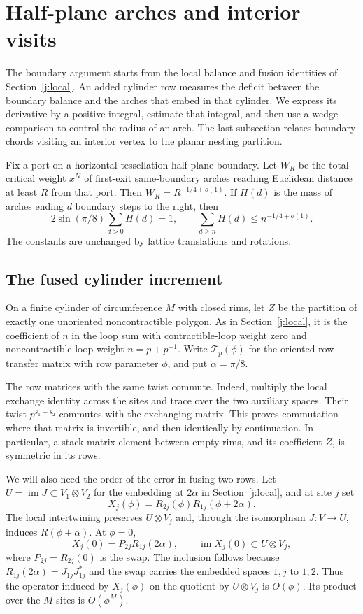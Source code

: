 \section{Half-plane arches and interior visits}\label{c7:boundary}

The boundary argument starts from the local balance and fusion identities of
Section~\ref{j:local}. An added cylinder row measures the deficit between
the boundary balance and the arches that embed in that cylinder. We express
its derivative by a positive integral, estimate that integral, and then use
a wedge comparison to control the radius of an arch. The last subsection
relates boundary chords visiting an interior vertex to the planar nesting
partition.

\begin{proposition}\label{j:boundary}
Fix a port on a horizontal tessellation half-plane boundary. Let $W_R$
be the total critical weight $x^N$ of first-exit same-boundary arches
reaching Euclidean distance at least $R$ from that port. Then
$W_R=R^{-1/4+o(1)}$. If $H(d)$ is the mass of arches ending $d$ boundary
steps to the right, then
\[
 2\sin(\pi/8)\sum_{d>0}H(d)=1,\qquad
 \sum_{d\ge n}H(d)\le n^{-1/4+o(1)}.
\]
The constants are unchanged by lattice translations and rotations.
\end{proposition}

\subsection{The fused cylinder increment}

On a finite cylinder of circumference $M$ with closed rims, let $Z$ be the
partition of exactly one unoriented noncontractible polygon. As in
Section~\ref{j:local}, it is the coefficient of $n$ in the loop sum with
contractible-loop weight zero and noncontractible-loop weight
$n=p+p^{-1}$. Write $\mathcal T_p(\phi)$ for the oriented row transfer
matrix with row parameter $\phi$, and put $\alpha=\pi/8$.

The row matrices with the same twist commute. Indeed, multiply the local
exchange identity across the sites and trace over the two auxiliary spaces.
Their twist $p^{s_1+s_2}$ commutes with the exchanging matrix. This proves
commutation where that matrix is invertible, and then identically by
continuation. In particular, a stack matrix element between empty rims, and
its coefficient $Z$, is symmetric in its rows.

We will also need the order of the error in fusing two rows. Let
$U=\operatorname{im}J\subset V_1\otimes V_2$ for the embedding at
$2\alpha$ in Section~\ref{j:local}, and at site $j$ set
\[
 X_j(\phi)=R_{2j}(\phi)R_{1j}(\phi+2\alpha).
\]
The local intertwining preserves $U\otimes V_j$ and, through the
isomorphism $J:V\to U$, induces $R(\phi+\alpha)$. At $\phi=0$,
\[
 X_j(0)=P_{2j}R_{1j}(2\alpha),\qquad
 \operatorname{im}X_j(0)\subset U\otimes V_j,
\]
where $P_{2j}=R_{2j}(0)$ is the swap. The inclusion follows because
$R_{1j}(2\alpha)=J_{1j}J_{1j}^*$ and the swap carries the embedded spaces
$1,j$ to $1,2$. Thus the operator induced by $X_j(\phi)$ on the quotient
by $U\otimes V_j$ is $O(\phi)$. Its product over the $M$ sites is
$O(\phi^M)$.

